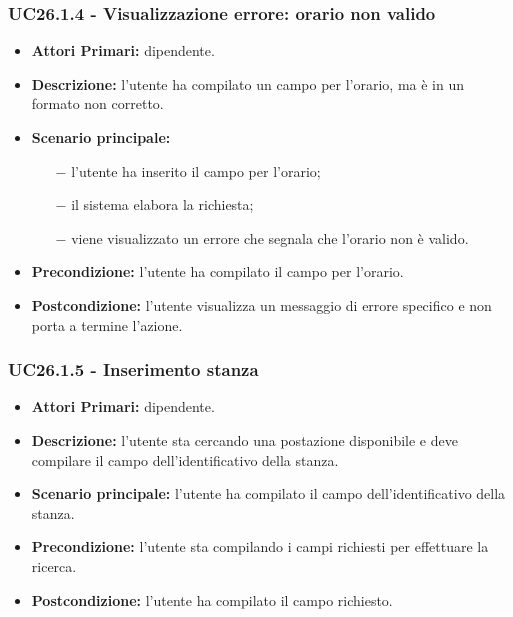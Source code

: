 \subsubsection{ UC26.1.4 - Visualizzazione errore: orario non valido }
\begin{itemize}
	\item\textbf{Attori Primari:} dipendente.
	\item\textbf{Descrizione:} l’utente ha compilato un campo per l'orario, ma è in un formato non corretto.
	\item\textbf{Scenario principale:} 
	\begin{itemize}
		\item[$-$] l’utente ha inserito il campo per l'orario;
		\item[$-$] il sistema elabora la richiesta;
		\item[$-$] viene visualizzato un errore che segnala che l'orario non è valido.
	\end{itemize}
	\item\textbf{Precondizione:} l’utente ha compilato il campo per l'orario.
	\item\textbf{Postcondizione:} l’utente visualizza un messaggio di errore specifico e non porta a termine l’azione.
\end{itemize}
\subsubsection{ UC26.1.5 - Inserimento stanza }
\begin{itemize}
	\item\textbf{Attori Primari:} dipendente.
	\item\textbf{Descrizione:} l’utente sta cercando una postazione disponibile e deve compilare il campo dell'identificativo della stanza.
	\item\textbf{Scenario principale:} l’utente ha compilato il campo dell'identificativo della stanza.
	\item\textbf{Precondizione:} l’utente sta compilando i campi richiesti per effettuare la ricerca.
	\item\textbf{Postcondizione:} l’utente ha compilato il campo richiesto.
\end{itemize}
